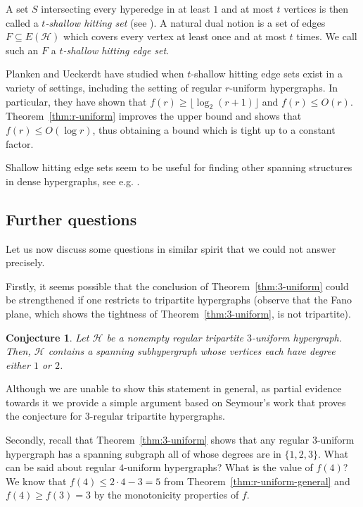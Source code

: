 \documentclass[11pt, a4paper]{article}
\numberwithin{theorem}{section} %
\newtheorem{conjecture}[theorem]{Conjecture}
\theoremstyle{remark}
\theoremstyle{definition}
\def\cH{\mathcal{H}}
\begin{document}
A set $S$ intersecting every hyperedge in at least $1$ and at most $t$ vertices is then called a \textit{$t$-shallow hitting set} (see \cite{PlankenUeckerdt23}). A natural dual notion is a set of edges $F\subseteq E(\cH)$ which covers every vertex at least once and at most $t$ times. We call such an $F$ a \textit{$t$-shallow hitting edge set}.

Planken and Ueckerdt \cite{PlankenUeckerdt23} have studied when $t$-shallow hitting edge sets exist in a variety of settings, including the setting of regular $r$-uniform hypergraphs. In particular, they have shown that $f(r)\geq \lfloor \log_2(r+1)\rfloor $ and $f(r)\leq O(r)$. Theorem~\ref{thm:r-uniform} improves the upper bound and shows that $f(r)\leq O(\log r)$, thus obtaining a bound which is tight up to a constant factor.

Shallow hitting edge sets seem to be useful for finding other spanning structures in dense hypergraphs, see e.g. \cite{LangSanhuezaMatamala23}.

\subsection{Further questions}

Let us now discuss some questions in similar spirit that we could not answer precisely. 

Firstly, it seems possible that the conclusion of Theorem~\ref{thm:3-uniform} could be strengthened if one restricts to tripartite hypergraphs (observe that the Fano plane, which shows the tightness of Theorem~\ref{thm:3-uniform}, is not tripartite). 

\begin{conjecture}\label{conj:tripartite}
Let $\cH$ be a nonempty regular tripartite $3$-uniform hypergraph. Then, $\cH$ contains a spanning subhypergraph whose vertices each have degree either $1$ or $2$.
\end{conjecture}

Although we are unable to show this statement in general, as partial evidence towards it we provide a simple argument based on Seymour's work \cite{Seymour74} that proves the conjecture for $3$-regular tripartite hypergraphs. 

Secondly, recall that Theorem~\ref{thm:3-uniform} shows that any regular $3$-uniform hypergraph has a spanning subgraph all of whose degrees are in $\{1, 2, 3\}$. What can be said about regular $4$-uniform hypergraphs? What is the value of $f(4)$? We know that $f(4)\leq 2\cdot 4-3=5$ from Theorem~\ref{thm:r-uniform-general} and $f(4)\geq f(3)=3$ by the monotonicity properties of $f$.
\end{document}
